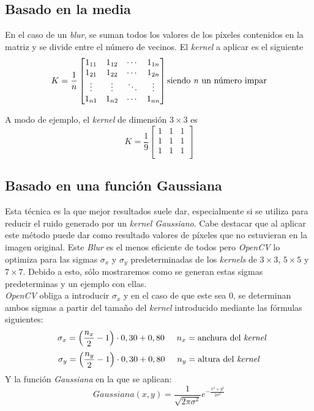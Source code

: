 \subsection{Basado en la media}
En el caso de un \emph{blur}, se suman todos los valores de los
píxeles contenidos en la matriz y se divide entre el número de
vecinos. El \emph{kernel} a aplicar es el siguiente
\begin{equation*}
  K = \frac{1}{n}
  \begin{bmatrix}
    1_{11} & 1_{12} & \cdots & 1_{1n} \\
    1_{21} & 1_{22} & \cdots & 1_{2n} \\
    \vdots & \vdots & \ddots & \vdots \\
    1_{n1} & 1_{n2} & \cdots & 1_{nn} \\
  \end{bmatrix}
  \text{siendo \emph{n} un número impar}
\end{equation*}

A modo de ejemplo, el \emph{kernel} de dimensión $3\times3$ es
\begin{equation*}
  K = \frac{1}{9}
  \begin{bmatrix}
    1 & 1 & 1 \\
    1 & 1 & 1 \\
    1 & 1 & 1 \\
  \end{bmatrix}
\end{equation*}
\subsection{Basado en una función Gaussiana}
Esta técnica es la que mejor resultados suele dar, especialmente si se
utiliza para reducir el ruido generado por un \emph{kernel
  Gaussiano}. Cabe destacar que al aplicar este método puede dar como
resultado valores de píxeles que no estuvieran en la imagen
original. Este \emph{Blur} es el menos eficiente de todos pero
\emph{OpenCV} lo optimiza para las sigmas $\sigma_x$ y $\sigma_y$
predeterminadas de los \emph{kernels} de $3\times3$, $5\times5$ y
$7\times7$. Debido a esto, sólo mostraremos como se
generan estas sigmas predeterminas y un ejemplo con ellas.\\
\emph{OpenCV} obliga a introducir $\sigma_x$ y en el caso de que este
sea 0, se determinan ambos sigmas a partir del tamaño del
\emph{kernel} introducido mediante las fórmulas siguientes:
\begin{equation*}
  \hspace{0.25cm}\sigma_x = \left(\frac{n_x}{2} - 1 \right) \cdot 0,30 + 0,80 \hspace{0.5cm} n_x = \text{anchura del \emph{kernel}}
\end{equation*}
\begin{equation*}
  \sigma_y = \left(\frac{n_y}{2} - 1 \right) \cdot 0,30 + 0,80 \hspace{0.5cm} n_y = \text{altura del \emph{kernel}}
\end{equation*}
Y la función \emph{Gaussiana} en la que se aplican:
\begin{equation*}
  Gaussiana(x, y) = \frac{1}{\sqrt{2 \pi \sigma^{2}}}e^{- \frac{x^{2}+y^{2}}{2\sigma^{2}}}
\end{equation*}


